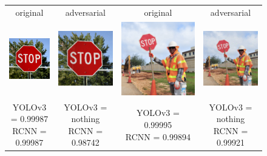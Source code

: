 \documentclass{article}
\begin{document}
\begin{figure}[h]
\centering
    \begin{tabular}{c c@{\hskip 1cm} c c}
        original & adversarial & original & adversarial \\
        \includegraphics[width=0.2\linewidth]{../test_images/stop.png} &  \includegraphics[width=0.2\linewidth]{../test_images/adversarial_out/stop.png} & 
        \includegraphics[width=0.2\linewidth]{../test_images/stop2.png} &  \includegraphics[width=0.2\linewidth]{../test_images/adversarial_out/stop2.png} \\

        \makecell[t]{YOLOv3 = 0.99987 \\ RCNN = 0.99987} & \makecell[t]{YOLOv3 = nothing \\ RCNN = 0.98742} & \makecell[t]{YOLOv3 = 0.99995 \\ RCNN = 0.99894} & \makecell[t]{YOLOv3 = nothing \\ RCNN = 0.99921} \\[1cm]


\end{tabular}
\end{figure}
\end{document}
